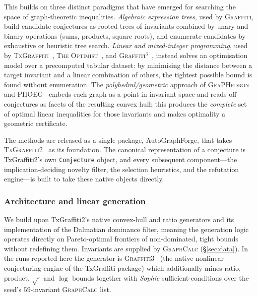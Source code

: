 \documentclass[]{ceurart}
\begin{document}
This builds on three distinct paradigms that have emerged for searching the space of graph-theoretic
inequalities. \emph{Algebraic expression trees}, used by \textsc{Graffiti}, build
candidate conjectures as rooted trees of invariants combined by unary and binary
operations (sums, products, square roots), and enumerate candidates by
exhaustive or heuristic tree search. \emph{Linear and mixed-integer programming},
used by \textsc{TxGraffiti}~\cite{davila2024automated,caro2022txgraffiti},
\textsc{The Optimist}~\cite{davila2024optimist}, and
\textsc{Graffiti}$^3$~\cite{davila2026graffiti3}, instead solves an
optimisation model over a precomputed tabular dataset: by minimising the
distance between a target invariant and a linear combination of others, the
tightest possible bound is found without enumeration. The
\emph{polyhedral/geometric} approach of \textsc{GraPHedron}~\cite{melot2008facet,caporossi2004graphedron} and
\textsc{PHOEG}~\cite{bonte2026phoeg,christophe2008linear} embeds each graph as a
point in invariant space and reads off conjectures as facets of the resulting
convex hull; this produces the \emph{complete} set of optimal linear
inequalities for those invariants and makes optimality a geometric certificate.

The methods are released as a single package, \textsf{AutoGraphForge},
that takes \textsc{TxGraffiti2}~\cite{davila2024automated} as its foundation. The canonical representation of a
conjecture is TxGraffiti2's own \texttt{Conjecture} object, and every subsequent component---the implication-deciding novelty filter, the
selection heuristics, and the refutation engine---is built to take these
native objects directly.

\subsubsection{Architecture and linear generation}
\label{sec:pipeline-arch}
We build upon TxGraffiti2's native convex-hull and ratio generators and its implementation of the Dalmatian dominance filter, meaning the generation logic operates directly on Pareto-optimal frontiers of non-dominated, tight bounds without redefining them. Invariants
are supplied by \textsc{GraphCalc} (\S\ref{sec:data}). In the runs reported here the generator is
\textsc{Graffiti3}~\cite{davila2026graffiti3} (the native nonlinear conjecturing
engine of the TxGraffiti package) which additionally mines ratio,
product, $\sqrt{\cdot}$ and $\log$ bounds together with \emph{Sophie} sufficient-conditions over
the seed's $59$-invariant \textsc{GraphCalc} list. 
\end{document}
